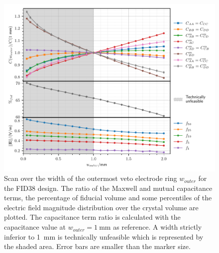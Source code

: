 \begin{figure}
\centering
\includegraphics[scale=1]{Figures/ElectrodesScan/capacitance_fiducial_full_edge.pdf}
\caption{Scan over the width of the outermost veto electrode ring $w_{outer}$ for the FID38 design. The ratio of the Maxwell and mutual capacitance terms, the percentage of fiducial volume and some percentiles of the electric field magnitude distribution over the crystal volume are plotted. The capacitance term ratio is calculated with the capacitance value at $w_{outer}=\SI{1}{\mm}$ as reference. A width strictly inferior to \SI{1}{\mm} is technically unfeasible which is represented by the shaded area. Error bars are smaller than the marker size.}
\label{fig:capacitance-fiducial-full-edge}
\end{figure}

